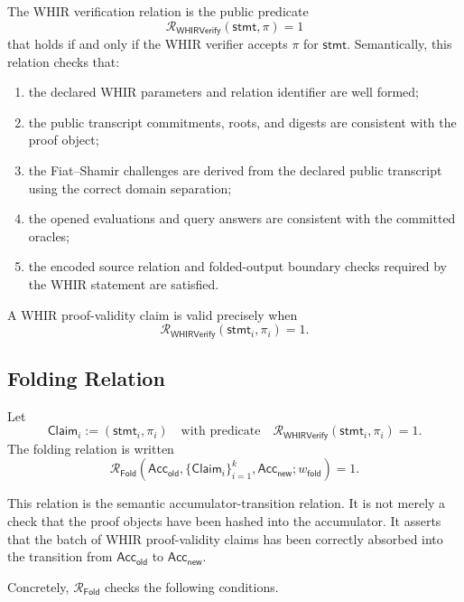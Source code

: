 \documentclass[11pt]{article}
\theoremstyle{definition}
\newcommand{\Acc}{\mathsf{Acc}}
\newcommand{\Rwhir}{\mathcal{R}_{\mathsf{WHIRVerify}}}
\newcommand{\Rfold}{\mathcal{R}_{\mathsf{Fold}}}
\begin{document}
The WHIR verification relation is the public predicate
\[
  \Rwhir(\mathsf{stmt},\pi)=1
\]
that holds if and only if the WHIR verifier accepts $\pi$ for
$\mathsf{stmt}$. Semantically, this relation checks that:
\begin{enumerate}
  \item the declared WHIR parameters and relation identifier are well formed;
  \item the public transcript commitments, roots, and digests are consistent
        with the proof object;
  \item the Fiat--Shamir challenges are derived from the declared public
        transcript using the correct domain separation;
  \item the opened evaluations and query answers are consistent with the
        committed oracles;
  \item the encoded source relation and folded-output boundary checks required
        by the WHIR statement are satisfied.
\end{enumerate}

A WHIR proof-validity claim is valid precisely when
\[
  \Rwhir(\mathsf{stmt}_i,\pi_i)=1.
\]
\subsection{Folding Relation}
\label{sec:folding-relation}
Let
\[
  \mathsf{Claim}_i
  :=
  (\mathsf{stmt}_i,\pi_i)
  \quad\text{with predicate}\quad
  \Rwhir(\mathsf{stmt}_i,\pi_i)=1.
\]
The folding relation is written
\[
  \Rfold\!\left(
    \Acc_{\mathsf{old}},
    \{\mathsf{Claim}_i\}_{i=1}^k,
    \Acc_{\mathsf{new}};
    w_{\mathsf{fold}}
  \right)=1.
\]

This relation is the semantic accumulator-transition relation. It is not merely
a check that the proof objects have been hashed into the accumulator. It asserts
that the batch of WHIR proof-validity claims has been correctly absorbed into
the transition from $\Acc_{\mathsf{old}}$ to $\Acc_{\mathsf{new}}$.

Concretely, $\Rfold$ checks the following conditions.
\end{document}
